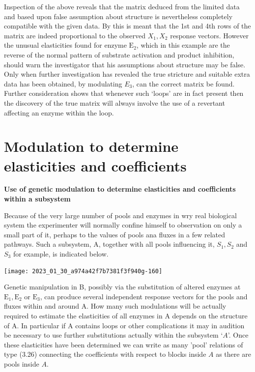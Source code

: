 
Inspection of the above reveals that the matrix deduced from the limited data and based upon false assumption about structure is nevertheless completely compatible with the given data. By this is meant that the 1st and 4th rows of the matrix are indeed proportional to the observed $X_1, X_2$ response vectors. However the unusual elasticities found for enzyme $\mathrm{E}_2$, which in this example are the reverse of the normal pattern of substrate activation and product inhibition, should warn the investigator that his assumptions about structure may be false. Only when further investigation has revealed the true stricture and suitable extra data has been obtained, by modulating $E_3$, can the correct matrix be found. Further consideration shows that whenever such `loops' are in fact present then the discovery of the true matrix will always involve the use of a revertant affecting an enzyme within the loop.

\section{Modulation to determine elasticities and coefficients}

{\bf Use of genetic modulation to determine elasticities and coefficients within a subsystem}

Because of the very large number of pools and enzymes in wry real biological system the experimenter will normally confine himself to observation on only a small part of it, perhaps to the values of pools ana fluxes in a few related pathways. Such a subsystem, A, together with all pools influencing it, $S_{1}, S_{2}$ and $S_{3}$ for example, is indicated below.

\begin{center}
\texttt{[image: 2023\_01\_30\_a974a42f7b7381f3f940g-160]}
\end{center}

Genetic manipulation in B, possibly via the substitution of altered enzymes at $\mathrm{E}_{1}, \mathrm{E}_{2}$ or $\mathrm{E}_{3}$, can produce several independent response vectors for the pools and fluxes within and around A. How many such modulations will be actually required to estimate the elasticities of all enzymes in A depends on the structure of A. In particular if A contains loops or other complications it may in audition be necessary to use further substitutions actually within the subsystem `$A$'. Once these elasticities have been determined we can write as many 'pool'  relations of type (3.26) connecting the coefficients with respect to blocks inside $A$ as there are pools inside $A$.

